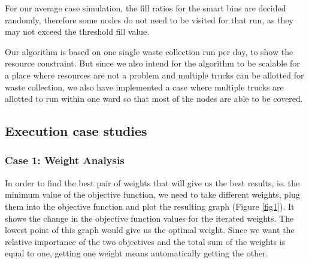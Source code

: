 \documentclass[12pt]{article}
\begin{document}
For our average case simulation, the fill ratios for the smart bins are decided randomly, therefore some nodes do not need to be visited for that run, as they may not exceed the threshold fill value.

Our algorithm is based on one single waste collection run per day, to show the resource constraint. But since we also intend for the algorithm to be scalable for a place where resources are not a problem and multiple trucks can be allotted for waste collection, we also have implemented a case where multiple trucks are allotted to run within one ward so that most of the nodes are able to be covered.
\subsection{Execution case studies}
\subsubsection*{Case 1: Weight Analysis}
In order to find the best pair of weights that will give us the best results, ie. the minimum value of the objective function, we need to take different weights, plug them into the objective function and plot the resulting graph (Figure \ref{fig1}). It shows the change in the objective function values for the iterated weights. The lowest point of this graph would give us the optimal weight. Since we want the relative importance of the two objectives and the total sum of the weights is equal to one, getting one weight means automatically getting the other.
\end{document}
